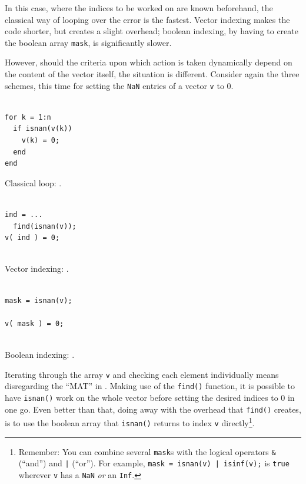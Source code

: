 In this case, where the indices to be worked on are known beforehand, the
classical way of looping over the error is the fastest. Vector indexing makes
the code shorter, but creates a slight overhead; boolean indexing, by having to
create the boolean array \lstinline!mask!, is significantly slower.

However, should the criteria upon which action is taken dynamically depend on
the content of the vector itself, the situation is different.  Consider again
the three schemes, this time for setting the \lstinline!NaN! entries of a
vector \lstinline!v! to $0$.

\hfill
\begin{minipage}[t]{.29\textwidth}
\begin{lstlisting}[framerule=1pt,rulecolor=\color{badred}]
% [...] create v

for k = 1:n
  if isnan(v(k))
    v(k) = 0;
  end
end
\end{lstlisting}
Classical loop: .
\end{minipage}
\hfill
\begin{minipage}[t]{.29\textwidth}
\begin{lstlisting}[framerule=1pt,rulecolor=\color{mediocre}]
% [...] create v

ind = ...
  find(isnan(v));
v( ind ) = 0;


\end{lstlisting}
Vector indexing: .
\end{minipage}
\hfill
\begin{minipage}[t]{.29\textwidth}
\begin{lstlisting}[framerule=1pt,rulecolor=\color{goodgreen}]
% [...] create v

mask = isnan(v);

v( mask ) = 0;


\end{lstlisting}
Boolean indexing: .
\end{minipage}
\hfill

Iterating through the array \lstinline!v! and checking each element
individually means disregarding the ``MAT'' in \matlab{}. Making use of the
\lstinline!find()! function, it is possible to have \lstinline!isnan()! work on
the whole vector before setting the desired indices to 0 in one go. Even better
than that, doing away with the overhead that \lstinline!find()! creates, is to
use the boolean array that \lstinline!isnan()! returns to index \lstinline!v!
directly\footnote{Remember: You can combine several \lstinline!mask!s with the
logical operators \lstinline!&! (``and'') and \lstinline!|! (``or''). For
example, \lstinline!mask = isnan(v) | isinf(v);! is \lstinline!true! wherever
\lstinline!v! has a \lstinline!NaN! \emph{or} an \lstinline!Inf!.}.

